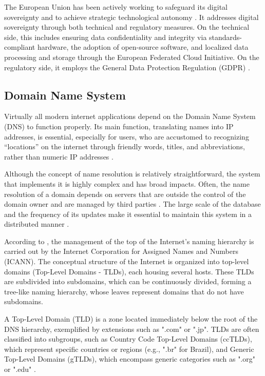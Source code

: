 \documentclass[12pt]{article}
\begin{document}
The European Union has been actively working to safeguard its digital sovereignty and to achieve strategic technological autonomy \cite{barrinha:22}. It addresses digital sovereignty through both technical and regulatory measures. On the technical side, this includes ensuring data confidentiality and integrity via standards-compliant hardware, the adoption of open-source software, and localized data processing and storage through the European Federated Cloud Initiative. On the regulatory side, it employs the General Data Protection Regulation (GDPR) \cite{tipper:22}.


\subsection{Domain Name System}
Virtually all modern internet applications depend on the Domain Name System (DNS) to function properly. Its main function, translating names into IP addresses, is essential, especially for users, who are accustomed to recognizing “locations” on the internet through friendly words, titles, and abbreviations, rather than numeric IP addresses \cite{deccio:09}.

Although the concept of name resolution is relatively straightforward, the system that implements it is highly complex and has broad impacts. Often, the name resolution of a domain depends on servers that are outside the control of the domain owner and are managed by third parties \cite{deccio:09}. The large scale of the database and the frequency of its updates make it essential to maintain this system in a distributed manner \cite{mockapetris:87a}.

According to \cite{tanenbaum:21}, the management of the top of the Internet's naming hierarchy is carried out by the Internet Corporation for Assigned Names and Numbers (ICANN). The conceptual structure of the Internet is organized into top-level domains (Top-Level Domains - TLDs), each housing several hosts. These TLDs are subdivided into subdomains, which can be continuously divided, forming a tree-like naming hierarchy, whose leaves represent domains that do not have subdomains.

A Top-Level Domain (TLD) is a zone located immediately below the root of the DNS hierarchy, exemplified by extensions such as ".com" or ".jp". TLDs are often classified into subgroups, such as Country Code Top-Level Domains (ccTLDs), which represent specific countries or regions (e.g., ".br" for Brazil), and Generic Top-Level Domains (gTLDs), which encompass generic categories such as ".org" or ".edu" \cite{hoffman:19}.
\end{document}
